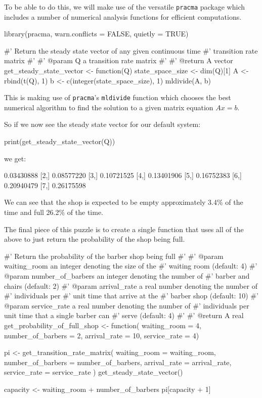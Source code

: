 To be able to do this, we will make use of the versatile \texttt{pracma}
package which includes a number of numerical analysis functions for efficient
computations.

\begin{Rin}
library(pracma, warn.conflicts = FALSE, quietly = TRUE)

#' Return the steady state vector of any given continuous time
#' transition rate matrix
#'
#' @param Q a transition rate matrix
#'
#' @return A vector
get_steady_state_vector <- function(Q){
  state_space_size <- dim(Q)[1]
  A <- rbind(t(Q), 1)
  b <- c(integer(state_space_size), 1)
  mldivide(A, b)
}
\end{Rin}

This is making use of \texttt{pracma}'s \texttt{mldivide} function
which chooses the best numerical algorithm to find the solution to a given
matrix equation \(Ax=b\).

So if we now see the steady state vector for our default system:

\begin{Rin}
print(get_steady_state_vector(Q))
\end{Rin}

we get:

\begin{Rout}
           [,1]
[1,] 0.03430888
[2,] 0.08577220
[3,] 0.10721525
[4,] 0.13401906
[5,] 0.16752383
[6,] 0.20940479
[7,] 0.26175598
\end{Rout}

We can see that the shop is expected to be empty approximately 3.4\% of the time
and full 26.2\% of the time.

The final piece of this puzzle is to create a single function that uses all of
the above to just return the probability of the shop being full.

\begin{Rin}
#' Return the probability of the barber shop being full
#'
#' @param waiting_room an integer denoting the size of the
#'        waiting room (default: 4)
#' @param number_of_barbers an integer denoting the number of
#'        barber and chairs (default: 2)
#' @param arrival_rate a real number denoting the number of
#'        individuals per #' unit time that arrive at the
#'        barber shop (default: 10)
#' @param service_rate a real number denoting the number of
#'        individuals per unit time that a single barber can
#'        serve (default: 4)
#'
#' @return A real
get_probability_of_full_shop <- function(
                                         waiting_room = 4,
                                         number_of_barbers = 2,
                                         arrival_rate = 10,
                                         service_rate = 4) {
  pi <- get_transition_rate_matrix(
    waiting_room = waiting_room,
    number_of_barbers = number_of_barbers,
    arrival_rate = arrival_rate,
    service_rate = service_rate
  ) %
    get_steady_state_vector()

  capacity <- waiting_room + number_of_barbers
  pi[capacity + 1]
}
\end{Rin}

